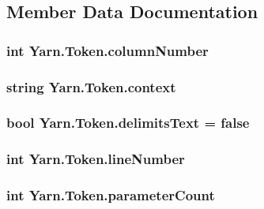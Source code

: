 \subsection{Member Data Documentation}
\hypertarget{a00079_a9a0f0a8a7ab1e90ab48f15192323ffca}{
\subsubsection[{column\-Number}]{\setlength{\rightskip}{0pt plus 5cm}int Yarn.\-Token.\-column\-Number}}\label{a00079_a9a0f0a8a7ab1e90ab48f15192323ffca}
\hypertarget{a00079_a089d248c904a6e8366b81c2c47ff5af8}{
\subsubsection[{context}]{\setlength{\rightskip}{0pt plus 5cm}string Yarn.\-Token.\-context}}\label{a00079_a089d248c904a6e8366b81c2c47ff5af8}
\hypertarget{a00079_af15d26fa4e6f276ab58ff66d3c4203da}{
\subsubsection[{delimits\-Text}]{\setlength{\rightskip}{0pt plus 5cm}bool Yarn.\-Token.\-delimits\-Text = false}}\label{a00079_af15d26fa4e6f276ab58ff66d3c4203da}
\hypertarget{a00079_a80fe710713201bb793a41452e314a721}{
\subsubsection[{line\-Number}]{\setlength{\rightskip}{0pt plus 5cm}int Yarn.\-Token.\-line\-Number}}\label{a00079_a80fe710713201bb793a41452e314a721}
\hypertarget{a00079_adf11c0d29b66935a8d8109d6308d0488}{
\subsubsection[{parameter\-Count}]{\setlength{\rightskip}{0pt plus 5cm}int Yarn.\-Token.\-parameter\-Count}}\label{a00079_adf11c0d29b66935a8d8109d6308d0488}
